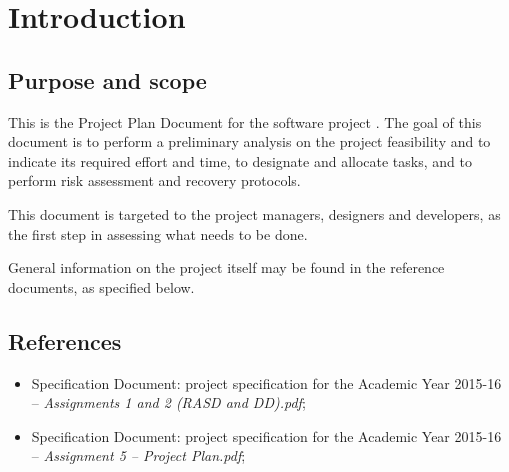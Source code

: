 \chapter{Introduction}

\section{Purpose and scope}
This is the Project Plan Document for the software project \mts{}. The goal of this document is to perform a preliminary analysis on the project feasibility and to indicate its required effort and time, to designate and allocate tasks, and to perform risk assessment and recovery protocols.

This document is targeted to the project managers, designers and developers, as the first step in assessing what needs to be done.

General information on the \mts{} project itself may be found in the reference documents, as specified below.

\section{References}
\begin{itemize}
\item Specification Document: \mts{} project specification for the Academic Year 2015-16 -- \emph{Assignments 1 and 2 (RASD and DD).pdf};
\item Specification Document: \mts{} project specification for the Academic Year 2015-16 -- \emph{Assignment 5 -- Project Plan.pdf};
\end{itemize}
